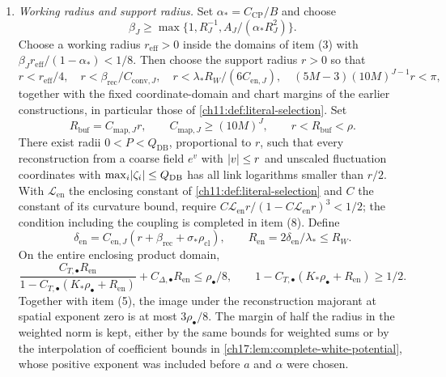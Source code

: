 \begin{theorem}
\begin{enumerate}[label=(\arabic*)]
\item \emph{Working radius and support radius.} Set $\alpha_*=C_{\mathrm{CP}}/B$ and choose
\[
 \beta_J\ge\max\{1,R_J^{-1},A_J/(\alpha_*R_J^2)\}.
\]
Choose a working radius $r_{\mathrm{eff}}>0$ inside the domains of item \textup{(3)} with $\beta_Jr_{\mathrm{eff}}/(1-\alpha_*)<1/8$. Then choose the support radius $r>0$ so that
\[
 r<r_{\mathrm{eff}}/4,\quad r<\beta_{\mathrm{rec}}/C_{\mathrm{conv},J},\quad
 r<\lambda_*R_W/(6C_{\mathrm{en},J}),\quad (5M-3)(10M)^{J-1}r<\pi,
\]
together with the fixed coordinate-domain and chart margins of the earlier constructions, in particular those of \cref{ch11:def:literal-selection}. Set
\[
 R_{\mathrm{buf}}=C_{\mathrm{map},J}r,\qquad C_{\mathrm{map},J}\ge(10M)^J,\qquad r<R_{\mathrm{buf}}<\rho.
\]
There exist radii $0<P<Q_{\mathrm{DB}}$, proportional to $r$, such that every reconstruction from a coarse field $e^v$ with $\lvert v\rvert\le r$ and unscaled fluctuation coordinates with $\max_i\lvert \zeta_i\rvert\le Q_{\mathrm{DB}}$ has all link logarithms smaller than $r/2$. With $\mathscr L_{\mathrm{en}}$ the enclosing constant of \cref{ch11:def:literal-selection} and $C$ the constant of its curvature bound, require $C\mathscr L_{\mathrm{en}}r/(1-C\mathscr L_{\mathrm{en}}r)^3<1/2$; the condition including the coupling is completed in item \textup{(8)}. Define
\[
 \delta_{\mathrm{en}}=C_{\mathrm{en},J}(r+\beta_{\mathrm{rec}}+\sigma_*\rho_{\mathrm{cl}}),\qquad
 R_{\mathrm{en}}=2\delta_{\mathrm{en}}/\lambda_*\le R_W.
\]
On the entire enclosing product domain,
\[
 \frac{C_{T,\bullet}R_{\mathrm{en}}}{1-C_{T,\bullet}(K_*\rho_\bullet+R_{\mathrm{en}})}+C_{\Delta,\bullet}R_{\mathrm{en}}\le\rho_\bullet/8,\qquad
 1-C_{T,\bullet}(K_*\rho_\bullet+R_{\mathrm{en}})\ge1/2.
\]
Together with item \textup{(5)}, the image under the reconstruction majorant at spatial exponent zero is at most $3\rho_\bullet/8$. The margin of half the radius in the weighted norm is kept, either by the same bounds for weighted sums or by the interpolation of coefficient bounds in \cref{ch17:lem:complete-white-potential}, whose positive exponent was included before $a$ and $\alpha$ were chosen.


\end{enumerate}
\end{theorem}
